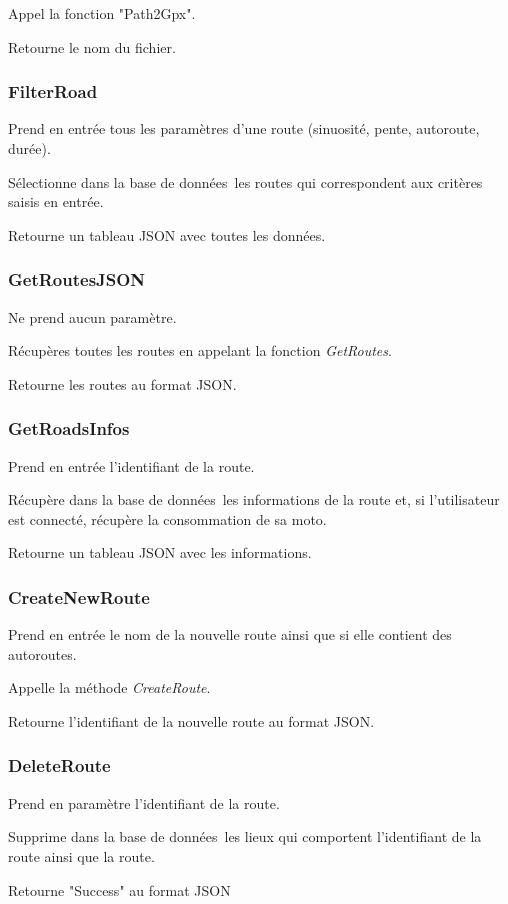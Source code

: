 \documentclass[a4paper]{article}
\newcommand{\bdd}{base de données}
\begin{document}
Appel la fonction "Path2Gpx".

Retourne le nom du fichier.

\subsubsection{FilterRoad}
Prend en entrée tous les paramètres d'une route (sinuosité, pente, autoroute, durée).

Sélectionne dans la \bdd \ les routes qui correspondent aux critères saisis en entrée.

Retourne un tableau JSON avec toutes les données.


\subsubsection{GetRoutesJSON}
Ne prend aucun paramètre.

Récupères toutes les routes en appelant la fonction \emph{GetRoutes}.

Retourne les routes au format JSON.


\subsubsection{GetRoadsInfos}
Prend en entrée l'identifiant de la route.

Récupère dans la \bdd \ les informations de la route et, si l'utilisateur est connecté, récupère la consommation de sa moto.

Retourne un tableau JSON avec les informations.

\subsubsection{CreateNewRoute}
Prend en entrée le nom de la nouvelle route ainsi que si elle contient des autoroutes.

Appelle la méthode \emph{CreateRoute}.

Retourne l'identifiant de la nouvelle route au format JSON.

\subsubsection{DeleteRoute}
Prend en paramètre l'identifiant de la route.

Supprime dans la \bdd \ les lieux qui comportent l'identifiant de la route ainsi que la route.

Retourne "Success" au format JSON
\newpage
\end{document}
